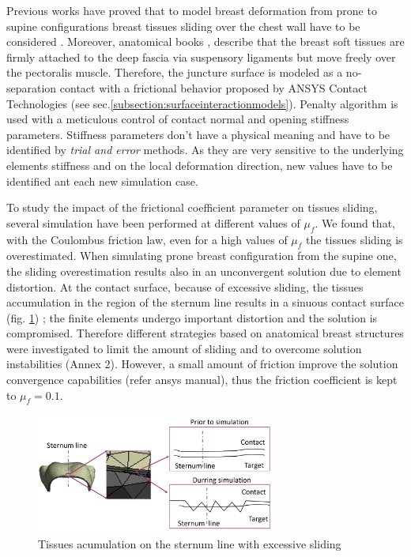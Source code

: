 Previous works have proved that to model breast deformation from prone to supine configurations breast tissues sliding over the chest wall have to be considered \citep{carter_application_2012,han_nonlinear_2014}. Moreover, anatomical books \citep{mugea2014aesthetic,clemente2011anatomy},  describe that the breast soft tissues are firmly attached to the deep fascia via suspensory ligaments but move freely over the pectoralis muscle.  Therefore, the juncture surface is modeled as a no-separation contact with a frictional behavior proposed by ANSYS Contact Technologies (see sec.\ref{subsection:surfaceinteractionmodels}). Penalty algorithm  is used with a meticulous control of contact normal and opening stiffness parameters. Stiffness parameters don't have a physical meaning and have to be identified by \textit{trial and error} methods. As they are very sensitive to the underlying elements stiffness and on the local deformation direction, new values have to be identified ant each new simulation case.    

To study the impact of the frictional coefficient parameter on tissues sliding, several simulation have been performed at different values of $\mu_f$. We found that, with the Coulombus friction law, even for a high values of $\mu_f$ the tissues sliding is overestimated. When simulating prone breast configuration from the supine one, the sliding overestimation results also in an unconvergent solution due to element distortion. At the contact surface, because of excessive sliding, the tissues accumulation in the region of the sternum line results in a sinuous contact surface  (fig. \ref{fig:overslidingProblem}) ; the finite elements  undergo important distortion and the solution is compromised. Therefore different strategies based on anatomical breast structures were investigated to limit the amount of sliding and to overcome solution instabilities (Annex 2). However, a small amount of friction improve the solution convergence capabilities (refer ansys manual), thus the friction coefficient is kept to $\mu_f = 0.1$. 
\begin{figure}[!h]
\centering
\includegraphics[width=0.7\textwidth,keepaspectratio]{figures/overslidingProblem.jpg} 
\caption{Tissues acumulation on the sternum line with excessive sliding}\label{fig:overslidingProblem}
\end{figure}
 
